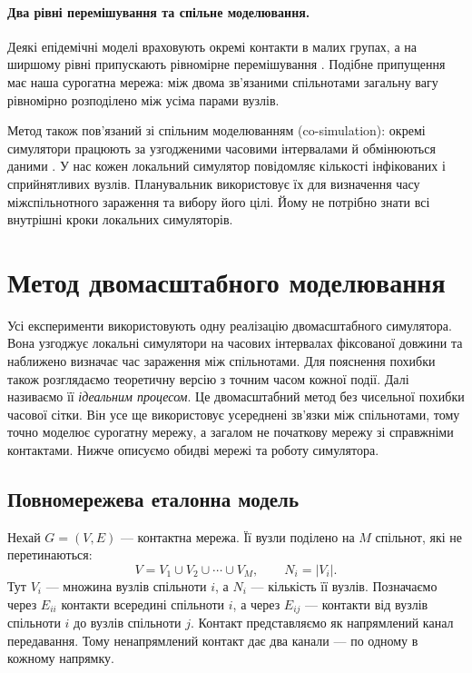 \paragraph{Два рівні перемішування та спільне моделювання.}
Деякі епідемічні моделі враховують окремі контакти в малих групах, а на ширшому рівні припускають рівномірне перемішування \citep{ball1997}. Подібне припущення має наша сурогатна мережа: між двома зв'язаними спільнотами загальну вагу рівномірно розподілено між усіма парами вузлів.

Метод також пов'язаний зі спільним моделюванням (co-simulation): окремі симулятори працюють за узгодженими часовими інтервалами й обмінюються даними \citep{gomes2018cosim}. У нас кожен локальний симулятор повідомляє кількості інфікованих і сприйнятливих вузлів. Планувальник використовує їх для визначення часу міжспільнотного зараження та вибору його цілі. Йому не потрібно знати всі внутрішні кроки локальних симуляторів.

\clearpage
\section{Метод двомасштабного моделювання}
\label{sec:method}

Усі експерименти використовують одну реалізацію двомасштабного симулятора. Вона узгоджує локальні симулятори на часових інтервалах фіксованої довжини та наближено визначає час зараження між спільнотами. Для пояснення похибки також розглядаємо теоретичну версію з точним часом кожної події. Далі називаємо її \emph{ідеальним процесом}. Це двомасштабний метод без чисельної похибки часової сітки. Він усе ще використовує усереднені зв'язки між спільнотами, тому точно моделює сурогатну мережу, а загалом не початкову мережу зі справжніми контактами. Нижче описуємо обидві мережі та роботу симулятора.

\subsection{Повномережева еталонна модель}
\label{sec:reference}

Нехай $G=(V,E)$ --- контактна мережа. Її вузли поділено на $M$ спільнот, які не перетинаються:
\begin{equation}
\label{eq:partition}
V=V_1\cup V_2\cup\cdots\cup V_M,
\qquad N_i=|V_i|.
\end{equation}
Тут $V_i$ --- множина вузлів спільноти $i$, а $N_i$ --- кількість її вузлів. Позначаємо через $E_{ii}$ контакти всередині спільноти $i$, а через $E_{ij}$ --- контакти від вузлів спільноти $i$ до вузлів спільноти $j$. Контакт представляємо як напрямлений канал передавання. Тому ненапрямлений контакт дає два канали --- по одному в кожному напрямку.

